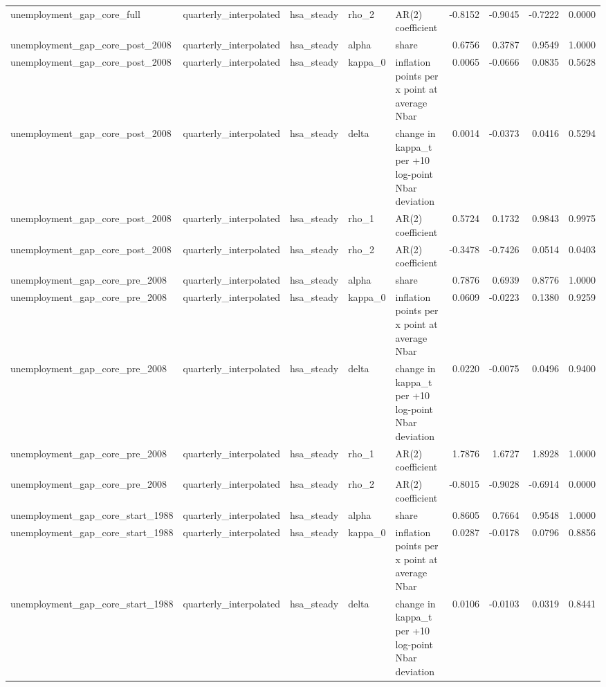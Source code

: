\begin{tabular}{lllllrrrr}
unemployment\_gap\_core\_full & quarterly\_interpolated & hsa\_steady & rho\_2 & AR(2) coefficient & -0.8152 & -0.9045 & -0.7222 & 0.0000 \\
unemployment\_gap\_core\_post\_2008 & quarterly\_interpolated & hsa\_steady & alpha & share & 0.6756 & 0.3787 & 0.9549 & 1.0000 \\
unemployment\_gap\_core\_post\_2008 & quarterly\_interpolated & hsa\_steady & kappa\_0 & inflation points per x point at average Nbar & 0.0065 & -0.0666 & 0.0835 & 0.5628 \\
unemployment\_gap\_core\_post\_2008 & quarterly\_interpolated & hsa\_steady & delta & change in kappa\_t per +10 log-point Nbar deviation & 0.0014 & -0.0373 & 0.0416 & 0.5294 \\
unemployment\_gap\_core\_post\_2008 & quarterly\_interpolated & hsa\_steady & rho\_1 & AR(2) coefficient & 0.5724 & 0.1732 & 0.9843 & 0.9975 \\
unemployment\_gap\_core\_post\_2008 & quarterly\_interpolated & hsa\_steady & rho\_2 & AR(2) coefficient & -0.3478 & -0.7426 & 0.0514 & 0.0403 \\
unemployment\_gap\_core\_pre\_2008 & quarterly\_interpolated & hsa\_steady & alpha & share & 0.7876 & 0.6939 & 0.8776 & 1.0000 \\
unemployment\_gap\_core\_pre\_2008 & quarterly\_interpolated & hsa\_steady & kappa\_0 & inflation points per x point at average Nbar & 0.0609 & -0.0223 & 0.1380 & 0.9259 \\
unemployment\_gap\_core\_pre\_2008 & quarterly\_interpolated & hsa\_steady & delta & change in kappa\_t per +10 log-point Nbar deviation & 0.0220 & -0.0075 & 0.0496 & 0.9400 \\
unemployment\_gap\_core\_pre\_2008 & quarterly\_interpolated & hsa\_steady & rho\_1 & AR(2) coefficient & 1.7876 & 1.6727 & 1.8928 & 1.0000 \\
unemployment\_gap\_core\_pre\_2008 & quarterly\_interpolated & hsa\_steady & rho\_2 & AR(2) coefficient & -0.8015 & -0.9028 & -0.6914 & 0.0000 \\
unemployment\_gap\_core\_start\_1988 & quarterly\_interpolated & hsa\_steady & alpha & share & 0.8605 & 0.7664 & 0.9548 & 1.0000 \\
unemployment\_gap\_core\_start\_1988 & quarterly\_interpolated & hsa\_steady & kappa\_0 & inflation points per x point at average Nbar & 0.0287 & -0.0178 & 0.0796 & 0.8856 \\
unemployment\_gap\_core\_start\_1988 & quarterly\_interpolated & hsa\_steady & delta & change in kappa\_t per +10 log-point Nbar deviation & 0.0106 & -0.0103 & 0.0319 & 0.8441 \\

\end{tabular}
